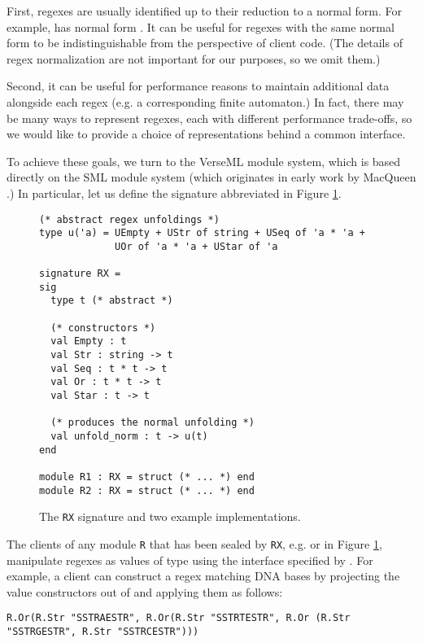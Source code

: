 First, regexes are usually identified up to their reduction to a normal form. For example,  has normal form . It can be useful for regexes with the same normal form to be  indistinguishable from the perspective of client code. (The details of regex normalization are not important for our purposes, so we omit them.)

Second, it can be useful for performance reasons to maintain additional data alongside each regex (e.g. a corresponding finite automaton.) In fact, there may be many ways to represent regexes, each with different performance trade-offs, so we would like to provide a choice of representations behind a common interface.

To achieve these goals, we turn to the VerseML module system, which is based directly on the SML module system \cite{mthm97-for-dart,dreyer2005understanding} (which originates in early work by MacQueen \cite{MacQueen:1984:MSM:800055.802036}.) In particular, let us define the {signature} abbreviated  in Figure \ref{fig:signature-RX}.

\begin{figure}[ht]
\begin{lstlisting}[deletekeywords={case}]
(* abstract regex unfoldings *)
type u('a) = UEmpty + UStr of string + USeq of 'a * 'a + 
             UOr of 'a * 'a + UStar of 'a

signature RX = 
sig
  type t (* abstract *)

  (* constructors *)
  val Empty : t
  val Str : string -> t
  val Seq : t * t -> t
  val Or : t * t -> t
  val Star : t -> t

  (* produces the normal unfolding *)
  val unfold_norm : t -> u(t)
end

module R1 : RX = struct (* ... *) end
module R2 : RX = struct (* ... *) end
\end{lstlisting}
\vspace{-5px}
\caption{The \lstinline{RX} signature and two example implementations.}
\label{fig:signature-RX}
\end{figure}

The clients of any module \lstinline{R} that has been sealed by \lstinline{RX}, e.g.  or   in Figure \ref{fig:signature-RX}, manipulate regexes as values of type  using the interface specified by . For example, a client can construct a regex matching DNA bases by projecting the value constructors out of  and applying them as follows:
\begin{lstlisting}[numbers=none]
R.Or(R.Str "SSTRAESTR", R.Or(R.Str "SSTRTESTR", R.Or (R.Str "SSTRGESTR", R.Str "SSTRCESTR")))
\end{lstlisting}

